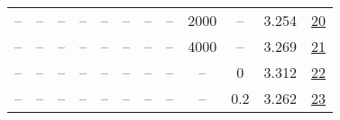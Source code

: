 \begin{table}[H]
\begin{tabular}{cccccccccccc}
-- & -- & -- & -- & -- & -- & -- & -- & 2000 & -- & 3.254 & \href{https://wandb.ai/stanford-mercury/optimizer-scaling/runs/sweep-300m-6B-mars83418dlr0.008-wd0.1-minlr0-warmup2000-b10.98-b-e1073a}{20} \\
-- & -- & -- & -- & -- & -- & -- & -- & 4000 & -- & 3.269 & \href{https://wandb.ai/stanford-mercury/optimizer-scaling/runs/sweep-300m-6B-mars58d878lr0.008-wd0.1-minlr0-warmup4000-b10.98-b-032e46}{21} \\
-- & -- & -- & -- & -- & -- & -- & -- & -- & 0 & 3.312 & \href{https://wandb.ai/stanford-mercury/optimizer-scaling/runs/sweep-300m-6B-mars17b945lr0.008-wd0-minlr0-warmup1000-b10.98-b20-409c3e}{22} \\
-- & -- & -- & -- & -- & -- & -- & -- & -- & 0.2 & 3.262 & \href{https://wandb.ai/stanford-mercury/optimizer-scaling/runs/sweep-300m-6B-mars399b10lr0.008-wd0.2-minlr0-warmup1000-b10.98-b-d46890}{23} \\
\bottomrule
\end{tabular}
\end{table}

